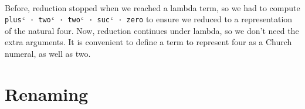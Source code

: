 \begin{fence}
\begin{code}
\AgdaSymbol{))))}\<%
\\
%
\\[\AgdaEmptyExtraSkip]%
\>[0]\AgdaSpace{}%
\AgdaSymbol{:}\AgdaSpace{}%
\AgdaSpace{}%
\AgdaSymbol{\{}\AgdaSymbol{\}}\AgdaSpace{}%
\AgdaSpace{}%
\AgdaSpace{}%
\AgdaSpace{}%
\<%
\\
\>[0]\AgdaSpace{}%
\AgdaSymbol{=}\AgdaSpace{}%
\AgdaSpace{}%
\AgdaSpace{}%
\AgdaSpace{}%
\AgdaSpace{}%
\AgdaSymbol{(}\AgdaOperator{\AgdaFunction{\#}}\AgdaSpace{}%
\AgdaSpace{}%
\AgdaSpace{}%
\AgdaOperator{\AgdaFunction{\#}}\AgdaSpace{}%
\AgdaSpace{}%
\AgdaSpace{}%
\AgdaSymbol{(}\AgdaOperator{\AgdaFunction{\#}}\AgdaSpace{}%
\AgdaSpace{}%
\AgdaSpace{}%
\AgdaOperator{\AgdaFunction{\#}}\AgdaSpace{}%
\AgdaSpace{}%
\AgdaSpace{}%
\AgdaOperator{\AgdaFunction{\#}}\AgdaSpace{}%
\AgdaSymbol{))}\<%
\\
%
\\[\AgdaEmptyExtraSkip]%
\>[0]\AgdaSpace{}%
\AgdaSymbol{:}\AgdaSpace{}%
\AgdaSpace{}%
\AgdaSpace{}%
\<%
\\
\>[0]\AgdaSpace{}%
\AgdaSymbol{=}\AgdaSpace{}%
\AgdaSpace{}%
\AgdaSpace{}%
\AgdaSpace{}%
\AgdaSpace{}%
\<%
\end{code}
\end{fence}

Before, reduction stopped when we reached a lambda term, so we had to
compute
\texttt{plusᶜ\ ·\ twoᶜ\ ·\ twoᶜ\ ·\ sucᶜ\ ·\ \textasciigrave{}zero} to
ensure we reduced to a representation of the natural four. Now,
reduction continues under lambda, so we don't need the extra arguments.
It is convenient to define a term to represent four as a Church numeral,
as well as two.

\hypertarget{renaming}{%
\section{Renaming}\label{renaming}}

